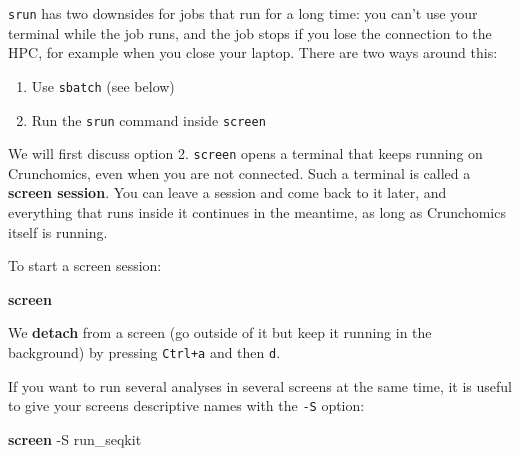 \documentclass[
  letterpaper,
  DIV=11,
  numbers=noendperiod]{scrreprt}
\newenvironment{Shaded}{}{}
\newcommand{\AttributeTok}[1]{\textcolor[rgb]{0.84,0.23,0.29}{#1}}
\newcommand{\ExtensionTok}[1]{\textcolor[rgb]{0.84,0.23,0.29}{\textbf{#1}}}
\newcommand{\NormalTok}[1]{\textcolor[rgb]{0.14,0.16,0.18}{#1}}
\providecommand{\tightlist}{%
  \setlength{\itemsep}{0pt}\setlength{\parskip}{0pt}}
\begin{document}
\begin{tcolorbox}[enhanced jigsaw, colbacktitle=quarto-callout-tip-color!10!white, rightrule=.15mm, leftrule=.75mm, colback=white, opacitybacktitle=0.6, title=\textcolor{quarto-callout-tip-color}{\faLightbulb}\hspace{0.5em}{Tip: Keeping srun jobs running with screen (optional)}, bottomrule=.15mm, left=2mm, colframe=quarto-callout-tip-color-frame, opacityback=0, breakable, bottomtitle=1mm, coltitle=black, arc=.35mm, toprule=.15mm, toptitle=1mm, titlerule=0mm]

\texttt{srun} has two downsides for jobs that run for a long time: you
can't use your terminal while the job runs, and the job stops if you
lose the connection to the HPC, for example when you close your laptop.
There are two ways around this:

\begin{enumerate}
\def\labelenumi{\arabic{enumi}.}
\tightlist
\item
  Use \texttt{sbatch} (see below)
\item
  Run the \texttt{srun} command inside \texttt{screen}
\end{enumerate}

We will first discuss option 2. \texttt{screen} opens a terminal that
keeps running on Crunchomics, even when you are not connected. Such a
terminal is called a \textbf{screen session}. You can leave a session
and come back to it later, and everything that runs inside it continues
in the meantime, as long as Crunchomics itself is running.

To start a screen session:

\begin{Shaded}
\begin{Highlighting}[]
\ExtensionTok{screen}
\end{Highlighting}
\end{Shaded}

We \textbf{detach} from a screen (go outside of it but keep it running
in the background) by pressing \texttt{Ctrl+a} and then \texttt{d}.

If you want to run several analyses in several screens at the same time,
it is useful to give your screens descriptive names with the \texttt{-S}
option:

\begin{Shaded}
\begin{Highlighting}[]
\ExtensionTok{screen} \AttributeTok{{-}S}\NormalTok{ run\_seqkit}
\end{Highlighting}
\end{Shaded}


\end{tcolorbox}
\end{document}
